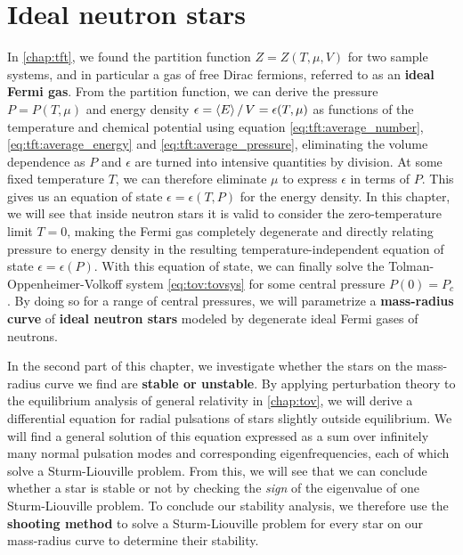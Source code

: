 \chapter{Ideal neutron stars}
\label{chap:nstars}

In \cref{chap:tft}, we found the partition function $Z = Z(T, \mu, V)$ for two sample systems, and in particular a gas of free Dirac fermions, referred to as an \textbf{ideal Fermi gas}.
From the partition function, we can derive the pressure $P = P(T, \mu)$ and energy density $\epsilon = \left< E \right> / \, V = \epsilon(T, \mu)$ as functions of the temperature and chemical potential using equation \eqref{eq:tft:average_number}, \eqref{eq:tft:average_energy} and \eqref{eq:tft:average_pressure}, eliminating the volume dependence as $P$ and $\epsilon$ are turned into intensive quantities by division.
At some fixed temperature $T$, we can therefore eliminate $\mu$ to express $\epsilon$ in terms of $P$.
This gives us an equation of state $\epsilon = \epsilon(T, P)$ for the energy density.
In this chapter, we will see that inside neutron stars it is valid to consider the zero-temperature limit $T=0$, making the Fermi gas completely degenerate and directly relating pressure to energy density in the resulting temperature-independent equation of state $\epsilon = \epsilon(P)$.
With this equation of state, we can finally solve the Tolman-Oppenheimer-Volkoff system \eqref{eq:tov:tovsys} for some central pressure $P(0)=P_c$.
By doing so for a range of central pressures, we will parametrize a \textbf{mass-radius curve} of \textbf{ideal neutron stars} modeled by degenerate ideal Fermi gases of neutrons.

In the second part of this chapter, we investigate whether the stars on the mass-radius curve we find are \textbf{stable or unstable}.
By applying perturbation theory to the equilibrium analysis of general relativity in \cref{chap:tov}, we will derive a differential equation for radial pulsations of stars slightly outside equilibrium.
We will find a general solution of this equation expressed as a sum over infinitely many normal pulsation modes and corresponding eigenfrequencies, each of which solve a Sturm-Liouville problem.
From this, we will see that we can conclude whether a star is stable or not by checking the \emph{sign} of the eigenvalue of one Sturm-Liouville problem.
To conclude our stability analysis, we therefore use the \textbf{shooting method} to solve a Sturm-Liouville problem for every star on our mass-radius curve to determine their stability.

